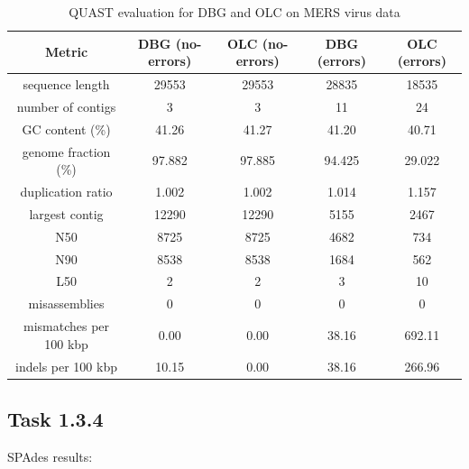 \documentclass[12pt]{article}
\begin{document}
\begin{table}[h!]
\begin{center}
\begin{tabular}{ |c|c|c||c|c| }
    \hline
    Metric & DBG (no-errors) & OLC (no-errors) & DBG (errors) & OLC (errors) \\
    \hline
    sequence length        & 29553  & 29553  & 28835 & 18535 \\
    number of contigs      & 3      & 3      & 11 & 24 \\
    GC content (\%)        & 41.26  & 41.27  & 41.20 & 40.71 \\
    genome fraction (\%)   & 97.882 & 97.885 & 94.425 & 29.022 \\
    duplication ratio      & 1.002  & 1.002  & 1.014 & 1.157 \\
    largest contig         & 12290  & 12290  & 5155 & 2467 \\
    N50                    & 8725   & 8725   & 4682 & 734 \\
    N90                    & 8538   & 8538   & 1684 & 562 \\
    L50                    & 2      & 2      & 3 & 10 \\
    misassemblies          & 0      & 0 & 0  & 0 \\
    mismatches per 100 kbp & 0.00   & 0.00   & 38.16 & 692.11 \\
    indels per 100 kbp     & 10.15  & 0.00   & 38.16 & 266.96 \\
    \hline
\end{tabular}
\end{center}
\caption{QUAST evaluation for DBG and OLC on MERS virus data}
\label{tab:quast_mers_dbg_olc}
\end{table}

\subsection{Task 1.3.4}

SPAdes results:
\end{document}
